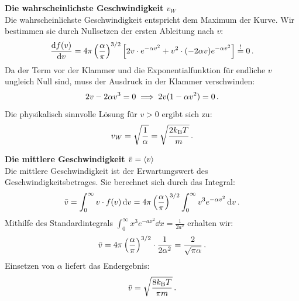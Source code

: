 \textbf{Die wahrscheinlichste Geschwindigkeit $v_W$}\\
Die wahrscheinlichste Geschwindigkeit entspricht dem Maximum der Kurve. Wir bestimmen sie durch Nullsetzen der ersten Ableitung nach $v$:
\begin{equation}
    \frac{\mathrm{d} f(v)}{\mathrm{d} v} = 4\pi \left( \frac{\alpha}{\pi} \right)^{3/2} \left[ 2v \cdot e^{-\alpha v^2} + v^2 \cdot (-2\alpha v) e^{-\alpha v^2} \right] \stackrel{!}{=} 0 \,.
\end{equation}
Da der Term vor der Klammer und die Exponentialfunktion für endliche $v$ ungleich Null sind, muss der Ausdruck in der Klammer verschwinden:
\begin{equation}
    2v - 2\alpha v^3 = 0 \implies 2v(1 - \alpha v^2) = 0 \,.
\end{equation}
Die physikalisch sinnvolle Lösung für $v > 0$ ergibt sich zu:
\begin{equation}\label{eq: mb_vW_result}
    v_W = \sqrt{\frac{1}{\alpha}} = \sqrt{\frac{2 k_{\mathrm{B}} T}{m}} \,.
\end{equation}

\textbf{Die mittlere Geschwindigkeit $\bar{v} = {\langle{v}\rangle}$}\\
Die mittlere Geschwindigkeit ist der Erwartungswert des Geschwindigkeitsbetrages. Sie berechnet sich durch das Integral:
\begin{equation}\label{eq: integral_ansatz_v_quer}
    \bar{v} = \int_0^\infty v \cdot f(v) \,\mathrm{d} v = 4\pi \left( \frac{\alpha}{\pi} \right)^{3/2} \int_0^\infty v^3 e^{-\alpha v^2} \,\mathrm{d} v \,.
\end{equation}
Mithilfe des Standardintegrals $\int_0^\infty x^3 e^{-ax^2} \dd x = \frac{1}{2a^2}$ erhalten wir:
\begin{equation}
    \bar{v} = 4\pi \left( \frac{\alpha}{\pi} \right)^{3/2} \cdot \frac{1}{2\alpha^2} = \frac{2}{\sqrt{\pi \alpha}} \,.
\end{equation}
Einsetzen von $\alpha$ liefert das Endergebnis:
\begin{equation}\label{eq: mb_v_quer_result}
    \bar{v} = \sqrt{\frac{8 k_{\mathrm{B}} T}{\pi m}} \,.
\end{equation}

